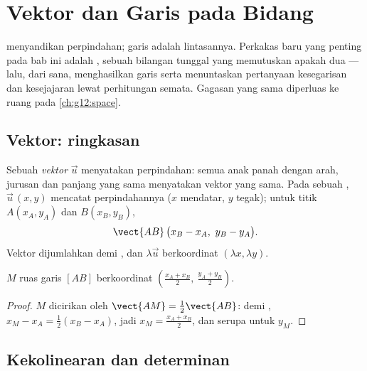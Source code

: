 \chapter{Vektor dan Garis pada Bidang}\label{ch:g11:vect}

 menyandikan perpindahan; garis adalah lintasannya. Perkakas baru yang
penting pada bab ini adalah \emph{}, sebuah bilangan tunggal yang
memutuskan apakah dua  --- lalu, dari sana, menghasilkan
 garis serta menuntaskan pertanyaan kesegarisan dan kesejajaran lewat
perhitungan semata. Gagasan yang sama diperluas ke ruang pada \cref{ch:g12:space}.

\section{Vektor: ringkasan}

\begin{definition}\label{def:g11:vect:vector}
Sebuah \emph{vektor} $\vec u$ menyatakan perpindahan: semua
anak panah dengan arah, jurusan dan panjang yang sama menyatakan vektor yang
sama. Pada sebuah , $\vec u\,(x, y)$ mencatat perpindahannya
($x$ mendatar, $y$ tegak); untuk titik $A(x_A, y_A)$ dan
$B(x_B, y_B)$,
\[
\vect{AB}\,\bigl(x_B - x_A,\ y_B - y_A\bigr).
\]
Vektor dijumlahkan  demi , dan $\lambda\vec u$ berkoordinat
$(\lambda x, \lambda y)$.
\end{definition}

\begin{proposition}\label{prop:g11:vect:midpoint}
 $M$ ruas garis $[AB]$ berkoordinat
$\left(\frac{x_A + x_B}{2},\ \frac{y_A + y_B}{2}\right)$.
\end{proposition}

\begin{proof}
$M$ dicirikan oleh $\vect{AM} = \frac12\vect{AB}$:  demi ,
$x_M - x_A = \frac12(x_B - x_A)$, jadi $x_M = \frac{x_A + x_B}{2}$, dan
serupa untuk $y_M$.
\end{proof}

\section{Kekolinearan dan determinan}

